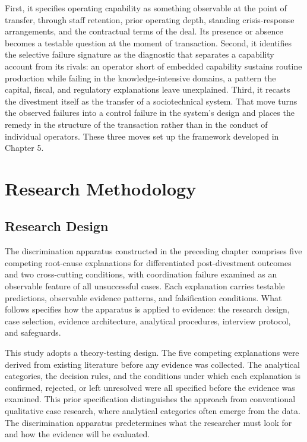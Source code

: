 \documentclass[twoside,fontset=lmodern]{mitthesis}
\begin{document}
First, it specifies operating capability as something observable at the
point of transfer, through staff retention, prior operating depth,
standing crisis-response arrangements, and the contractual terms of the
deal. Its presence or absence becomes a testable question at the moment
of transaction. Second, it identifies the selective failure signature as
the diagnostic that separates a capability account from its rivals: an
operator short of embedded capability sustains routine production while
failing in the knowledge-intensive domains, a pattern the capital,
fiscal, and regulatory explanations leave unexplained. Third, it recasts
the divestment itself as the transfer of a sociotechnical system. That
move turns the observed failures into a control failure in the system's
design and places the remedy in the structure of the transaction rather
than in the conduct of individual operators. These three moves set up
the framework developed in Chapter 5.


\hypertarget{research-methodology}{%
\chapter{Research Methodology}\label{research-methodology}}

\hypertarget{research-design}{%
\section{Research Design}\label{research-design}}

The discrimination apparatus constructed in the preceding chapter
comprises five competing root-cause explanations for differentiated
post-divestment outcomes and two cross-cutting conditions, with
coordination failure examined as an observable feature of all
unsuccessful cases. Each explanation carries testable predictions,
observable evidence patterns, and falsification conditions. What follows
specifies how the apparatus is applied to evidence: the research design,
case selection, evidence architecture, analytical procedures, interview
protocol, and safeguards.

This study adopts a theory-testing design. The five competing
explanations were derived from existing literature before any evidence
was collected. The analytical categories, the decision rules, and the
conditions under which each explanation is confirmed, rejected, or left
unresolved were all specified before the evidence was examined. This
prior specification distinguishes the approach from conventional
qualitative case research, where analytical categories often emerge from
the data. The discrimination apparatus predetermines what the researcher
must look for and how the evidence will be evaluated.
\end{document}
